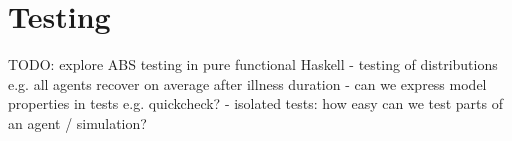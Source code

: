 \section{Testing}
TODO: explore ABS testing in pure functional Haskell
- testing of distributions e.g. all agents recover on average after illness duration
- can we express model properties in tests e.g. quickcheck?
- isolated tests: how easy can we test parts of an agent / simulation?